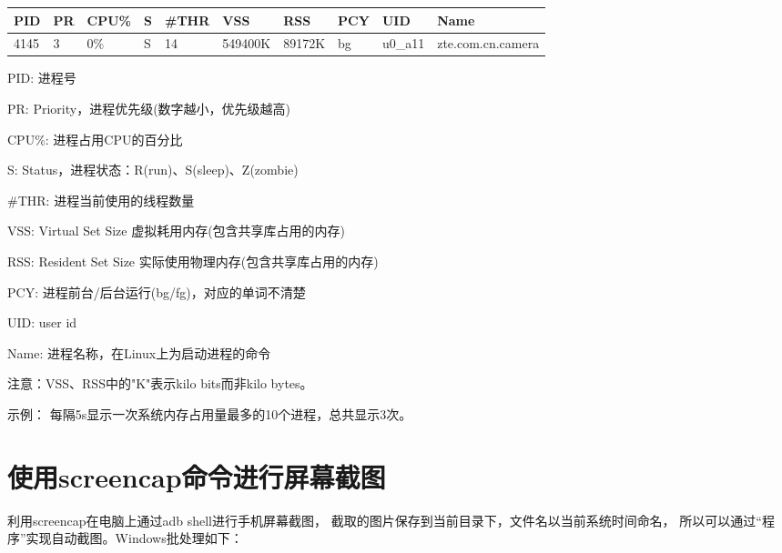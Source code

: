 \begin{center}
\begin{tabular}{llllllllll}
PID & PR & CPU\% & S & \#THR & VSS & RSS & PCY & UID & Name\\ \hline
4145 & 3 & 0\% & S & 14 & 549400K & 89172K & bg & u0\_a11 & zte.com.cn.camera
\end{tabular}
\end{center}
\begin{coloredenumerate}
\item PID: 进程号
\item PR: Priority，进程优先级(数字越小，优先级越高)
\item CPU\%: 进程占用CPU的百分比
\item S: Status，进程状态：R(run)、S(sleep)、Z(zombie)
\item \#THR: 进程当前使用的线程数量
\item VSS: Virtual Set Size 虚拟耗用内存(包含共享库占用的内存)
\item RSS: Resident Set Size 实际使用物理内存(包含共享库占用的内存)
\item PCY: 进程前台/后台运行(bg/fg)，对应的单词不清楚
\item UID: user id
\item Name: 进程名称，在Linux上为启动进程的命令
\end{coloredenumerate}
注意：VSS、RSS中的"K"表示kilo bits而非kilo bytes。\par
示例：
每隔5s显示一次系统内存占用量最多的10个进程，总共显示3次。

\section[使用screencap命令进行屏幕截图]{使用screencap命令进行屏幕截图}
利用screencap在电脑上通过adb shell进行手机屏幕截图，
截取的图片保存到当前目录下，文件名以当前系统时间命名，
所以可以通过“程序”实现自动截图。Windows批处理如下：\par\bigskip
\inputminted[linenos,tabsize=4,bgcolor=srcbg]{bash}{srcdir/capture.bat}
